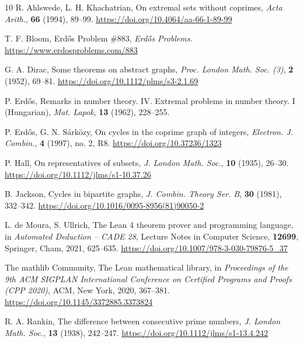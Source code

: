 \documentclass[11pt,a4paper]{article}
\theoremstyle{definition}
\theoremstyle{remark}
\begin{document}
\begin{thebibliography}{10}
\small
{} R. Ahlswede, L. H. Khachatrian, On extremal sets without coprimes, \emph{Acta
Arith.}, \textbf{66} (1994), 89--99. \url{https://doi.org/10.4064/aa-66-1-89-99}

 T. F. Bloom, Erd\H{o}s Problem \#883, \emph{Erd\H{o}s Problems}.
\url{https://www.erdosproblems.com/883}

 G. A. Dirac, Some theorems on abstract graphs, \emph{Proc. London Math. Soc.
(3)}, \textbf{2} (1952), 69--81. \url{https://doi.org/10.1112/plms/s3-2.1.69}

 P. Erd\H{o}s, Remarks in number theory. IV. Extremal problems in number theory. I
(Hungarian), \emph{Mat. Lapok}, \textbf{13} (1962), 228--255.

 P. Erd\H{o}s, G. N. S\'ark\"ozy, On cycles in the coprime graph of integers,
\emph{Electron. J. Combin.}, \textbf{4} (1997), no. 2, R8. \url{https://doi.org/10.37236/1323}

 P. Hall, On representatives of subsets, \emph{J. London Math. Soc.}, \textbf{10}
(1935), 26--30. \url{https://doi.org/10.1112/jlms/s1-10.37.26}

 B. Jackson, Cycles in bipartite graphs, \emph{J. Combin. Theory Ser. B},
\textbf{30} (1981), 332--342. \url{https://doi.org/10.1016/0095-8956(81)90050-2}

 L. de Moura, S. Ullrich, The Lean 4 theorem prover and programming language, in
\emph{Automated Deduction -- CADE 28}, Lecture Notes in Computer Science, \textbf{12699}, Springer,
Cham, 2021, 625--635. \url{https://doi.org/10.1007/978-3-030-79876-5_37}

 The mathlib Community, The Lean mathematical library, in \emph{Proceedings of the
9th ACM SIGPLAN International Conference on Certified Programs and Proofs (CPP 2020)}, ACM, New York,
2020, 367--381. \url{https://doi.org/10.1145/3372885.3373824}

 R. A. Rankin, The difference between consecutive prime numbers, \emph{J. London
Math. Soc.}, \textbf{13} (1938), 242--247. \url{https://doi.org/10.1112/jlms/s1-13.4.242}
\end{thebibliography}
\end{document}
